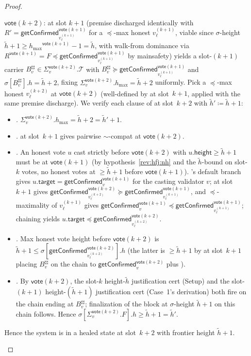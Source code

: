 \ifx\litemode\undefined\documentclass{article}\fi
\newcommand{\T}[0]{\ensuremath{\mathcal{T}}}
\newcommand{\target}{\mathsf{target}}
\newcommand{\height}{\mathsf{height}}
\newcommand{\hmax}{\ensuremath{h_{\max}}\xspace}
\newcommand{\vote}{\ensuremath{\mathsf{vote}}}
\newcommand{\comm}[1]{\ensuremath{\widetilde{#1}}}
\newcommand{\getConfirmed}{\textsf{getConfirmed}\xspace}
\theoremstyle{plain}
\theoremstyle{definition}
\theoremstyle{remark}
\begin{document}
\begin{proof}
\begin{description}
  $\vote(k+2)$:  at slot $k+1$ (premise discharged identically with $R' = \getConfirmed_{v_\ell^{(k+1)}}^{\vote(k+1)}$ for a $\preceq$-max honest $v_\ell^{(k+1)}$, viable since $\sigma$-height $\comm{h}+1 \geq \hmax^{\vote(k+1)}-1 = \comm{h}$, with walk-from dominance via $R^{\vote(k+1)} = F \preceq \getConfirmed_{v_\ell^{(k+1)}}^{\vote(k+1)}$ by mainsafety) yields a slot-$(k+1)$ carrier $B^{\sharp\sharp}_v \in \Sigma_v^{\vote(k+2)}.\T$ with $B^{\sharp\sharp}_v \succeq \getConfirmed_{v_\ell^{(k+1)}}^{\vote(k+1)}$ and $\sigma[B^{\sharp\sharp}_v].h = \comm{h}+2$, fixing $\Sigma_v^{\vote(k+2)}.\hmax = \comm{h}+2$ uniformly.
  Pick a $\preceq$-max honest $v_\ell^{(k+2)}$ at $\vote(k+2)$ (well-defined by  at slot~$k+1$, applied with the same premise discharge).
  We verify each clause of  at slot~$k+2$ with $\comm{h}' \coloneqq \comm{h}+1$:
  \begin{itemize}
    \item \emph{.} $\Sigma_v^{\vote(k+2)}.\hmax = \comm{h}+2 = \comm{h}'+1$.
    \item \emph{.}  at slot~$k+1$ gives pairwise $\sim$-compat at $\vote(k+2)$.
    \item \emph{.} An honest vote $u$ cast strictly before $\vote(k+2)$ with $u.\height \geq \comm{h}+1$ must be at $\vote(k+1)$ (by hypothesis~\ref{rev:hfj:nh} and the $\comm{h}$-bound on slot-$k$ votes, no honest votes at $\geq \comm{h}+1$ before $\vote(k+1)$). 's default branch gives $u.\target = \getConfirmed_v^{\vote(k+1)}$ for the casting validator $v$;  at slot~$k+1$ gives $\getConfirmed_{v_\ell^{(k+2)}}^{\vote(k+2)} \succeq \getConfirmed_{v_\ell^{(k+1)}}^{\vote(k+1)}$, and $\preceq$-maximality of $v_\ell^{(k+1)}$ gives $\getConfirmed_v^{\vote(k+1)} \preceq \getConfirmed_{v_\ell^{(k+1)}}^{\vote(k+1)}$; chaining yields $u.\target \preceq \getConfirmed_{v_\ell^{(k+2)}}^{\vote(k+2)}$.
    \item \emph{.} Max honest vote height before $\vote(k+2)$ is $\comm{h}+1 \leq \sigma[\getConfirmed_{v_\ell^{(k+2)}}^{\vote(k+2)}].h$ (the latter is $\geq \comm{h}+1$ by  at slot~$k+1$ placing $B^{\sharp\sharp}_v$ on the chain to $\getConfirmed_v^{\vote(k+2)}$ plus ).
    \item \emph{.} By $\vote(k+2)$, the slot-$k$ height-$\comm{h}$ justification cert (Setup) and the slot-$(k+1)$ height-$(\comm{h}+1)$ justification cert (Case~1's derivation) both fire on the chain ending at $B^{\sharp\sharp}_v$; finalization of the block at $\sigma$-height $\comm{h}+1$ on this chain follows. Hence $\sigma[\Sigma_v^{\vote(k+2)}.F].h \geq \comm{h}+1 = \comm{h}'$.
  \end{itemize}
  Hence the system is in a healed state at slot~$k+2$ with frontier height $\comm{h}+1$.


\end{description}
\end{proof}
\end{document}
